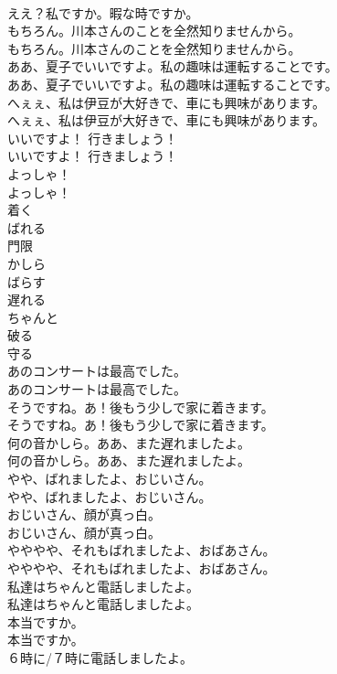 \documentclass[8pt]{extreport}
\begin{document}
\begin{CJK}{UTF8}{min}
\\	ええ？私ですか。暇な時ですか。 
\\	もちろん。川本さんのことを全然知りませんから。	
\\	もちろん。川本さんのことを全然知りませんから。 
\\	ああ、夏子でいいですよ。私の趣味は運転することです。	
\\	ああ、夏子でいいですよ。私の趣味は運転することです。 
\\	へぇぇ、私は伊豆が大好きで、車にも興味があります。	
\\	へぇぇ、私は伊豆が大好きで、車にも興味があります。 
\\	いいですよ！ 行きましょう！	
\\	いいですよ！ 行きましょう！ 
\\	よっしゃ！	
\\	よっしゃ！ 
\\	着く
\\	ばれる
\\	門限
\\	かしら
\\	ばらす
\\	遅れる
\\	ちゃんと
\\	破る
\\	守る
\\	あのコンサートは最高でした。	
\\	あのコンサートは最高でした。 
\\	そうですね。あ！後もう少しで家に着きます。	
\\	そうですね。あ！後もう少しで家に着きます。 
\\	何の音かしら。ああ、また遅れましたよ。	
\\	何の音かしら。ああ、また遅れましたよ。 
\\	やや、ばれましたよ、おじいさん。	
\\	やや、ばれましたよ、おじいさん。 
\\	おじいさん、顔が真っ白。	
\\	おじいさん、顔が真っ白。 
\\	やややや、それもばれましたよ、おばあさん。	
\\	やややや、それもばれましたよ、おばあさん。 
\\	私達はちゃんと電話しましたよ。	
\\	私達はちゃんと電話しましたよ。 
\\	本当ですか。	
\\	本当ですか。 
\\	６時に/７時に電話しましたよ。	

\end{CJK}
\end{document}
